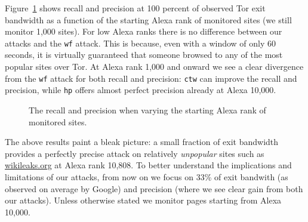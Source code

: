 Figure~\ref{fig:wfdns:alexa} shows recall and precision at 100 percent of
observed Tor exit bandwidth as a function of the starting Alexa rank of
monitored sites (we still monitor 1,000 sites).
For low Alexa ranks there is no difference between our attacks and the
\texttt{wf} attack. This is because, even with a window of only 60 seconds,
it is virtually guaranteed that someone browsed to any of the most popular
sites over Tor. At Alexa rank 1,000 and onward we see a clear divergence from
the \texttt{wf} attack for both recall and precision:
\texttt{ctw} can improve the recall and precision, while
\texttt{hp} offers almost perfect precision already at Alexa 10,000.

\begin{figure}[t]
\centering
{}
\caption{The recall and precision when varying the starting Alexa rank of
monitored sites.}
\label{fig:wfdns:alexa}
\end{figure}

The above results paint a bleak picture: a small fraction of exit
bandwidth provides a perfectly precise attack on relatively
\emph{unpopular} sites such as \url{wikileaks.org} at Alexa rank 10,808.
To better understand the implications and limitations of our attacks,
from now on we focus on
33\% of exit bandwith (as observed on average by Google) and
precision (where we see clear gain from both our attacks).
Unless otherwise stated
we monitor pages starting from Alexa 10,000.

